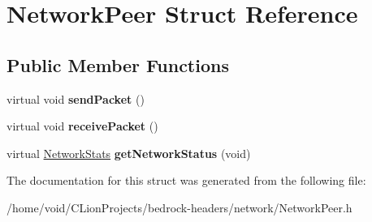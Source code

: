 \hypertarget{struct_network_peer}{}\section{Network\+Peer Struct Reference}
\label{struct_network_peer}
\subsection*{Public Member Functions}
\begin{DoxyCompactItemize}
\item 
\mbox{\label{struct_network_peer_ae6fcfbf5fab4c6d3a347df7801160679}} 
virtual void {\bfseries send\+Packet} ()
\item 
\mbox{\label{struct_network_peer_a888771a2b2c881330ec108039359c48a}} 
virtual void {\bfseries receive\+Packet} ()
\item 
\mbox{\label{struct_network_peer_ac9132499df27e8bad2b681408e8aa456}} 
virtual \mbox{\hyperlink{struct_network_stats}{Network\+Stats}} {\bfseries get\+Network\+Status} (void)
\end{DoxyCompactItemize}


The documentation for this struct was generated from the following file\+:\begin{DoxyCompactItemize}
\item 
/home/void/\+C\+Lion\+Projects/bedrock-\/headers/network/Network\+Peer.\+h\end{DoxyCompactItemize}
